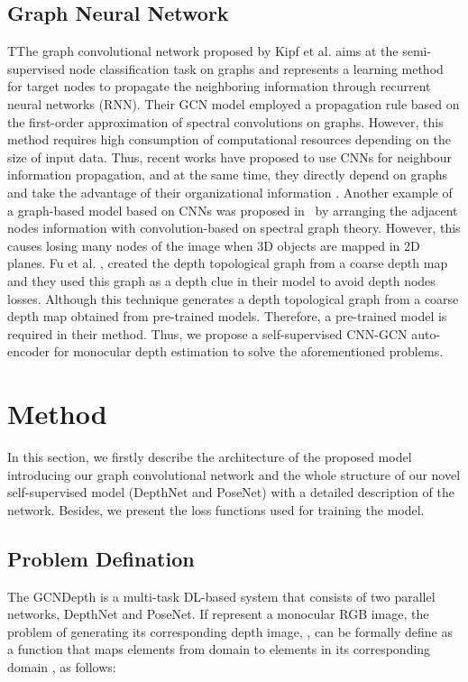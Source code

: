 \documentclass[journal]{IEEEtran}
\begin{document}
\subsection{Graph Neural Network}
TThe graph convolutional network proposed by Kipf et al. \cite{kipf2016semi} aims at the semi-supervised node classification task on graphs and represents a learning method for target nodes to propagate the neighboring information through recurrent neural networks (RNN). Their GCN model employed a propagation rule based on the first-order approximation of spectral convolutions on graphs. However, this method requires high consumption of computational resources depending on the size of input data. Thus, recent works have proposed to use CNNs for neighbour information propagation, and at the same time, they directly depend on graphs and take the advantage of their organizational information \cite{Zhang2019}. Another example of a graph-based model based on CNNs was proposed in~\cite{Bruna} by arranging the adjacent nodes information with convolution-based on spectral graph theory. However, this causes losing many nodes of the image when 3D objects are mapped in 2D planes. Fu et al. \cite{Fu2020}, created the depth topological graph from a coarse depth map and they used this graph as a depth clue in their model to avoid depth nodes losses. Although this technique generates a depth topological graph from a coarse depth map obtained from pre-trained models. Therefore, a pre-trained model is required in their method. Thus, we propose a self-supervised CNN-GCN auto-encoder for monocular depth estimation to solve the aforementioned problems.

\section{Method}
In this section, we firstly describe the architecture of the proposed model introducing our graph convolutional network and the whole structure of our novel self-supervised model (DepthNet and PoseNet) with a detailed description of the network. Besides, we present the loss functions used for training the model.

\subsection{Problem Defination}
The GCNDepth is a multi-task DL-based system that consists of two parallel networks, DepthNet and PoseNet. If  represent a monocular RGB image, the problem of generating its corresponding depth image, , can be formally define as a function  that maps elements from domain  to elements in its corresponding domain , as follows:
\end{document}
